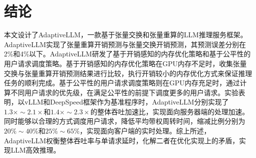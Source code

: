 \section{结论}

本文设计了AdaptiveLLM，一款基于张量交换和张量重算的LLM推理服务框架。AdaptiveLLM实现了张量重算开销预测与张量交换开销预测，其预测误差分别在2\%和4\%以下。AdaptiveLLM研发了基于开销感知的内存优化策略和基于公平性的用户请求调度策略。基于开销感知的内存优化策略在GPU内存不足时，收集张量交换与张量重算开销预测结果进行比较，执行开销较小的内存优化方式来保证推理任务的顺利完成。基于公平性的用户请求调度策略则在GPU内存充足时，通过计算不同用户请求的优先级，在满足公平性的前提下调度更多的用户请求。实验表明，以vLLM和DeepSpeed框架作为基准程序时，AdaptiveLLM分别实现了$1.3\times\sim2.1\times$和$1.4\times\sim2.3\times$的整体吞吐加速比，实现面向服务器端的处理加速。同时能够以合理的方式调度用户请求，降低平均带权周转时间，缩减比例分别为$20\%\sim40\%$和$25\%\sim65\%$，实现面向客户端的实时处理。综上所述，AdaptiveLLM权衡整体吞吐率与单请求延时，化解二者在优化实现上的矛盾，实现LLM高效推理。